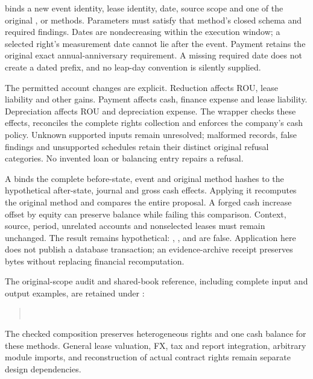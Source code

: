  binds a new event identity, lease identity, date, source
scope and one of the original ,  or
 methods. Parameters must satisfy that method's closed
schema and required findings. Dates are nondecreasing within the execution
window; a selected right's measurement date cannot lie after the event.
Payment retains the original exact annual-anniversary requirement. A missing
required date does not create a dated prefix, and no leap-day convention is
silently supplied.

The permitted account changes are explicit. Reduction affects ROU, lease
liability and other gains. Payment affects cash, finance expense and lease
liability. Depreciation affects ROU and depreciation expense. The wrapper checks
these effects, reconciles the complete rights collection and enforces the
company's cash policy. Unknown supported inputs remain unresolved; malformed
records, false findings and unsupported schedules retain their distinct original
refusal categories. No invented loan or balancing entry repairs a refusal.

A  binds the complete before-state, event and original
method hashes to the hypothetical after-state, journal and gross cash effects.
Applying it recomputes the original method and compares the entire proposal.
A forged cash increase offset by equity can preserve balance while failing
this comparison. Context, source, period, unrelated accounts and nonselected
leases must remain unchanged. The result remains hypothetical:
, ,  and
 are false. Application here does not publish a database
transaction; an evidence-archive receipt preserves bytes without replacing
financial recomputation.

The original-scope audit and shared-book reference, including complete input
and output examples, are retained under :
\begin{quote}\small
{}\\
\end{quote}
The checked composition preserves heterogeneous rights and one cash balance
for these methods. General lease valuation, FX, tax and report integration,
arbitrary module imports, and reconstruction of actual contract rights remain
separate design dependencies.
